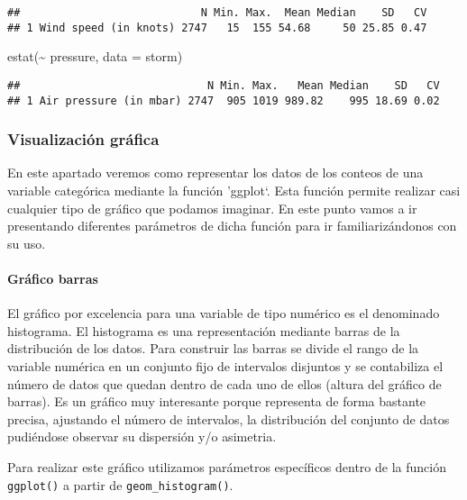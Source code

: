\documentclass[
]{book}
\newenvironment{Shaded}{\begin{snugshade}}{\end{snugshade}}
\newcommand{\AttributeTok}[1]{\textcolor[rgb]{0.77,0.63,0.00}{#1}}
\newcommand{\FunctionTok}[1]{\textcolor[rgb]{0.00,0.00,0.00}{#1}}
\newcommand{\NormalTok}[1]{#1}
\newcommand{\SpecialCharTok}[1]{\textcolor[rgb]{0.00,0.00,0.00}{#1}}
\begin{document}
\begin{verbatim}
##                            N Min. Max.  Mean Median    SD   CV
## 1 Wind speed (in knots) 2747   15  155 54.68     50 25.85 0.47
\end{verbatim}

\begin{Shaded}
\begin{Highlighting}[]
\FunctionTok{estat}\NormalTok{(}\SpecialCharTok{\textasciitilde{}}\NormalTok{ pressure, }\AttributeTok{data =}\NormalTok{ storm)}
\end{Highlighting}
\end{Shaded}

\begin{verbatim}
##                             N Min. Max.   Mean Median    SD   CV
## 1 Air pressure (in mbar) 2747  905 1019 989.82    995 18.69 0.02
\end{verbatim}

\hypertarget{visualizaciuxf3n-gruxe1fica-1}{%
\subsubsection{Visualización gráfica}\label{visualizaciuxf3n-gruxe1fica-1}}

En este apartado veremos como representar los datos de los conteos de una variable categórica mediante la función 'ggplot`. Esta función permite realizar casi cualquier tipo de gráfico que podamos imaginar. En este punto vamos a ir presentando diferentes parámetros de dicha función para ir familiarizándonos con su uso.

\hypertarget{gruxe1fico-barras-1}{%
\paragraph{Gráfico barras}\label{gruxe1fico-barras-1}}

El gráfico por excelencia para una variable de tipo numérico es el denominado histograma. El histograma es una representación mediante barras de la distribución de los datos. Para construir las barras se divide el rango de la variable numérica en un conjunto fijo de intervalos disjuntos y se contabiliza el número de datos que quedan dentro de cada uno de ellos (altura del gráfico de barras). Es un gráfico muy interesante porque representa de forma bastante precisa, ajustando el número de intervalos, la distribución del conjunto de datos pudiéndose observar su dispersión y/o asimetria.

Para realizar este gráfico utilizamos parámetros específicos dentro de la función \texttt{ggplot()} a partir de \texttt{geom\_histogram()}.
\end{document}
